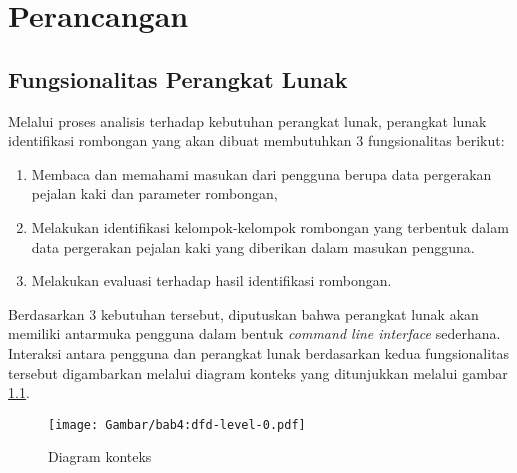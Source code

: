 \chapter{Perancangan}
\label{chap:perancangan}

\iffalse

Sebelum melalui tahap implementasi, perangkat lunak perlu melalui proses perancangan perangkat lunak. Perancangan perangkat lunak merupakan sebuah proses untuk mengidentifikasi artefak-artefak dari perangkat lunak seperti modul, fungsi, kelas, serta artefak-artefak lainnya yang bertujuan untuk memenuhi kebutuhan perangkat lunak. Manfaat utama dari perancangan perangkat lunak adalah supaya perilaku perangkat lunak yang dihasilkan dapat lebih mudah diprediksi dan dikontrol sehingga perangkat lunak dapat lebih mudah dikembangkan dan diperbaiki di masa depan \cite{budgen:04:software-design}.

\fi

\section{Fungsionalitas Perangkat Lunak}
\label{sec:functionality}

Melalui proses analisis terhadap kebutuhan perangkat lunak, perangkat lunak identifikasi rombongan yang akan dibuat membutuhkan 3 fungsionalitas berikut:

\begin{enumerate}
    \item Membaca dan memahami masukan dari pengguna berupa data pergerakan pejalan kaki dan parameter rombongan,
    \item Melakukan identifikasi kelompok-kelompok rombongan yang terbentuk dalam data pergerakan pejalan kaki yang diberikan dalam masukan pengguna.
    \item Melakukan evaluasi terhadap hasil identifikasi rombongan.
\end{enumerate}

Berdasarkan 3 kebutuhan tersebut, diputuskan bahwa perangkat lunak akan memiliki antarmuka pengguna dalam bentuk \textit{command line interface} sederhana. Interaksi antara pengguna dan perangkat lunak berdasarkan kedua fungsionalitas tersebut digambarkan melalui diagram konteks yang ditunjukkan melalui gambar \ref{bab4:context-diagram}.

\begin{figure}[h]
    \centering
    \texttt{[image: Gambar/bab4:dfd-level-0.pdf]}
    \caption{Diagram konteks}
    \label{bab4:context-diagram}
\end{figure}

